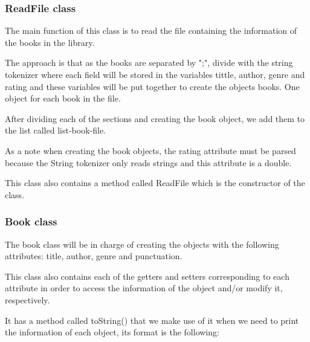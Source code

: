\documentclass[a4paper]{article}
\theoremstyle{plain}
\theoremstyle{definition}
\begin{document}
	    
	    
	    \subsubsection{ ReadFile class}
	    The main function of this class is to read the file containing the information of the books in the library. \newline

        The approach is that as the books are separated by ";", divide with the string tokenizer where each field will be stored in the variables tittle, author, genre and rating and these variables will be put together to create the objects books. One object for each book in the file.\newline

        After dividing each of the sections and creating the book object, we add them to the list called list-book-file.
        
        As a note when creating the book objects, the rating attribute must be parsed because the String tokenizer only reads strings and this attribute is a double.
        
        This class also contains a method called ReadFile which is the constructor of the class.
    
	    \subsubsection{ Book class}
	    
	    The book class will be in charge of creating the objects with the following attributes: title, author, genre and punctuation.\newline

         This class also contains each of the getters and setters corresponding to each attribute in order to access the information of the object and/or modify it, respectively.\newline

         It has a method called toString() that we make use of it when we need to print the information of each object, its format is the following:\newline
    
\end{document}
